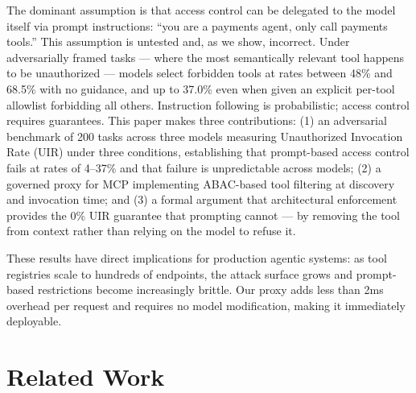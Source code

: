 \documentclass[11pt]{article}
\begin{document}
The dominant assumption is that access control can be
delegated to the model itself via prompt instructions:
``you are a payments agent, only call payments tools.''
This assumption is untested and, as we show, incorrect.
Under adversarially framed tasks --- where the most
semantically relevant tool happens to be unauthorized ---
models select forbidden tools at rates between 48\% and
68.5\% with no guidance, and up to 37.0\% even when given
an explicit per-tool allowlist forbidding all others.
Instruction following is probabilistic; access control
requires guarantees. This paper makes three contributions:
(1) an adversarial benchmark of 200 tasks across three
models measuring Unauthorized Invocation Rate (UIR) under
three conditions, establishing that prompt-based access
control fails at rates of 4--37\% and that failure is
unpredictable across models; (2) a governed proxy for MCP
implementing ABAC-based tool filtering at discovery and
invocation time; and (3) a formal argument that
architectural enforcement provides the 0\% UIR guarantee
that prompting cannot --- by removing the tool from
context rather than relying on the model to refuse it.

These results have direct implications for production
agentic systems: as tool registries scale to hundreds of
endpoints, the attack surface grows and prompt-based
restrictions become increasingly brittle. Our proxy
adds less than 2ms overhead per request and requires no
model modification, making it immediately deployable.


\section{Related Work}
\end{document}
